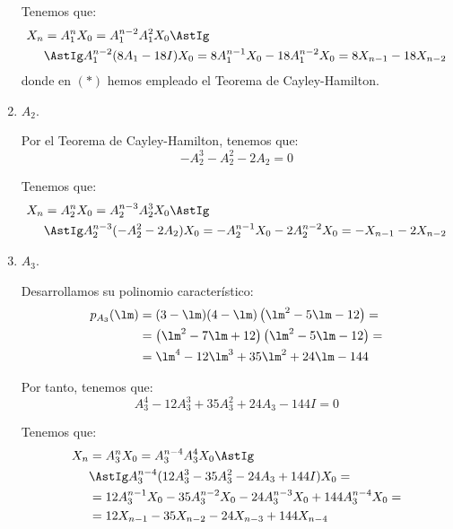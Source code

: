 \begin{ejercicio}
\begin{enumerate}
    Tenemos que:
    \begin{align*}
        X_{n} &= A_1^nX_0
        = A_1^{n-2}A_1^2X_0
        \AstIg\\&\AstIg
        A_1^{n-2}(8A_1 - 18I)X_0
        = 8A_1^{n-1}X_0 - 18A_1^{n-2}X_0
        = 8X_{n-1} - 18X_{n-2}
    \end{align*}
    donde en $(\ast)$ hemos empleado el Teorema de Cayley-Hamilton.

    \item $A_2$.
    
    Por el Teorema de Cayley-Hamilton, tenemos que:
    \begin{equation*}
        -A_2^3 - A_2^2 - 2A_2 = 0
    \end{equation*}

    Tenemos que:
    \begin{align*}
        X_{n} &= A_2^nX_0
        = A_2^{n-3}A_2^3X_0
        \AstIg\\&\AstIg
        A_2^{n-3}(-A_2^2 - 2A_2)X_0
        = -A_2^{n-1}X_0 - 2A_2^{n-2}X_0
        = -X_{n-1} - 2X_{n-2}
    \end{align*}

    \item $A_3$.
    
    Desarrollamos su polinomio característico:
    \begin{align*}
        p_{A_3}(\lm) &= (3-\lm)(4-\lm)\left(\lm^2-5\lm-12\right)
        =\\&= \left(\lm^2-7\lm +12\right)\left(\lm^2-5\lm-12\right)
        =\\&= \lm^4 -12\lm^3+35\lm^2+24\lm-144
    \end{align*}

    Por tanto, tenemos que:
    \begin{equation*}
        A_3^4 - 12A_3^3 + 35A_3^2 + 24A_3 - 144I = 0
    \end{equation*}

    Tenemos que:
    \begin{align*}
        X_{n} &= A_3^nX_0
        = A_3^{n-4}A_3^4X_0
        \AstIg\\&\AstIg
        A_3^{n-4}(12A_3^3 - 35A_3^2 - 24A_3 + 144I)X_0
        =\\&= 12A_3^{n-1}X_0 - 35A_3^{n-2}X_0 - 24A_3^{n-3}X_0 + 144A_3^{n-4}X_0
        =\\&= 12X_{n-1} - 35X_{n-2} - 24X_{n-3} + 144X_{n-4}
    \end{align*}
\end{enumerate}
\end{ejercicio}

